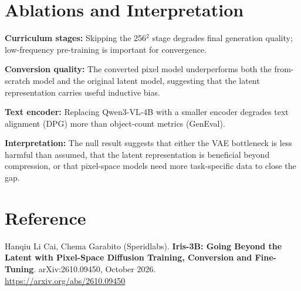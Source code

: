 \documentclass[10pt,twocolumn]{article}
\begin{document}
\section{Ablations and Interpretation}

\textbf{Curriculum stages:} Skipping the 256$^2$ stage degrades final
generation quality; low-frequency pre-training is important for convergence.

\textbf{Conversion quality:} The converted pixel model underperforms both
the from-scratch model and the original latent model, suggesting that the
latent representation carries useful inductive bias.

\textbf{Text encoder:} Replacing Qwen3-VL-4B with a smaller encoder
degrades text alignment (DPG) more than object-count metrics (GenEval).

\textbf{Interpretation:} The null result suggests that either the VAE
bottleneck is less harmful than assumed, that the latent representation
is beneficial beyond compression, or that pixel-space models need more
task-specific data to close the gap.

\section*{Reference}

Hanqiu Li Cai, Chema Garabito (Speridlabs).
\textbf{Iris-3B: Going Beyond the Latent with Pixel-Space Diffusion
Training, Conversion and Fine-Tuning}.
arXiv:2610.09450, October 2026.\\
\url{https://arxiv.org/abs/2610.09450}
\end{document}
